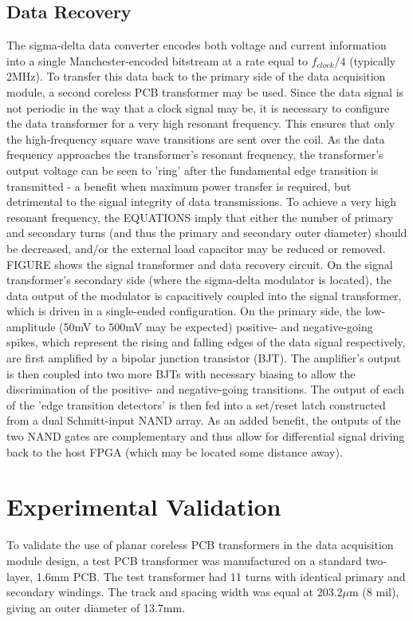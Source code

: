 \documentclass[conference]{IEEEtran}
\begin{document}
	\subsection{Data Recovery}
	The sigma-delta data converter encodes both voltage and current information into a single Manchester-encoded bitstream at a rate equal to $ f_{clock}/4 $ (typically 2MHz).  To transfer this data back to the primary side of the data acquisition module, a second coreless PCB transformer may be used.  Since the data signal is not periodic in the way that a clock signal may be, it is necessary to configure the data transformer for a very high resonant frequency.  This ensures that only the high-frequency square wave transitions are sent over the coil.  As the data frequency approaches the transformer's resonant frequency, the transformer's output voltage can be seen to 'ring' after the fundamental edge transition is transmitted - a benefit when maximum power transfer is required, but detrimental to the signal integrity of data transmissions.  To achieve a very high resonant frequency, the EQUATIONS imply that either the number of primary and secondary turns (and thus the primary and secondary outer diameter) should be decreased, and/or the external load capacitor may be reduced or removed.
	FIGURE shows the signal transformer and data recovery circuit.  On the signal transformer's secondary side (where the sigma-delta modulator is located), the data output of the modulator is capacitively coupled into the signal transformer, which is driven in a single-ended configuration.  On the primary side, the low-amplitude (50mV to 500mV may be expected) positive- and negative-going spikes, which represent the rising and falling edges of the data signal respectively, are first amplified by a bipolar junction transistor (BJT).  The amplifier's output is then coupled into two more BJTs with necessary biasing to allow the discrimination of the positive- and negative-going transitions.  The output of each of the 'edge transition detectors' is then fed into a set/reset latch constructed from a dual Schmitt-input NAND array.  As an added benefit, the outputs of the two NAND gates are complementary and thus allow for differential signal driving back to the host FPGA (which may be located some distance away).
	
\section{Experimental Validation}
To validate the use of planar coreless PCB transformers in the data acquisition module design, a test PCB transformer was manufactured on a standard two-layer, 1.6mm PCB.  The test transformer had 11 turns with identical primary and secondary windings.  The track and spacing width was equal at $ 203.2\mu $m (8 mil), giving an outer diameter of 13.7mm.
\end{document}
